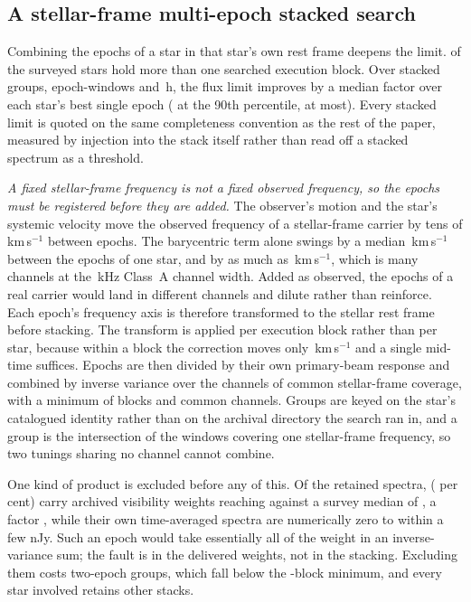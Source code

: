 \subsection{A stellar-frame multi-epoch stacked search}
\label{sec:stack}

Combining the epochs of a star in that star's own rest frame deepens the
limit. \StkNStar{} of the surveyed stars hold more than one searched
execution block. Over \StkNGroup{} stacked groups, \StkNEpochComb{}
epoch-windows and \StkHours\,h, the flux limit improves by a median factor
\StkLimitGainMed{} over each star's best single epoch
(\StkLimitGainPNinety{} at the 90th percentile, \StkLimitGainMax{} at most).
Every stacked limit is quoted on the same completeness convention as the rest
of the paper, measured by injection into the stack itself rather than read off
a stacked spectrum as a threshold.

\emph{A fixed stellar-frame frequency is not a fixed observed frequency, so
the epochs must be registered before they are added.} The observer's motion
and the star's systemic velocity move the observed frequency of a
stellar-frame carrier by tens of km\,s$^{-1}$ between epochs. The
barycentric term alone swings by a median \StkVcorrSwingMed\,km\,s$^{-1}$
between the epochs of one star, and by as much as
\StkVcorrSwingMax\,km\,s$^{-1}$, which is many channels at the
\StkRefChanKHz\,kHz Class~A channel width. Added as observed, the epochs of
a real carrier would land in different channels and dilute rather than
reinforce. Each epoch's frequency axis is therefore transformed to the
stellar rest frame before stacking. The transform is applied per execution
block rather than per star, because within a block the correction moves only
\StkIntraBlockKms\,km\,s$^{-1}$ and a single mid-time suffices. Epochs are
then divided by their own primary-beam response and combined by inverse
variance over the channels of common stellar-frame coverage, with a minimum
of \StkMinBlocks{} blocks and \StkMinChan{} common channels. Groups are
keyed on the star's catalogued identity rather than on the archival directory
the search ran in, and a group is the intersection of
the windows covering one stellar-frame frequency, so two tunings sharing no
channel cannot combine.

One kind of product is excluded before any of this. Of the \StkNProd{}
retained spectra, \StkBadWeight{} (\StkBadWeightPct{} per cent) carry
archived visibility weights reaching \StkBadWeightMax{} against a survey
median of \StkBadWeightMed, a factor \StkBadWeightRatio, while their own
time-averaged spectra are numerically zero to within a few nJy. Such an epoch
would take essentially all of the weight in an inverse-variance sum; the fault
is in the delivered weights, not in the stacking. Excluding them costs
\StkBadGroupDrop{} two-epoch groups, which fall below the
\StkMinBlocks-block minimum, and every star involved retains other stacks.

